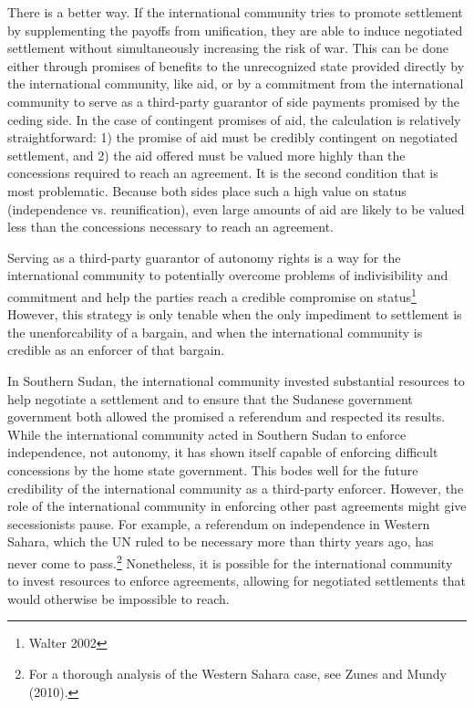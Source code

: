 \documentclass[12pt,letterpaper, notitlepage]{article}
\begin{document}
There is a better way. If the international community tries to promote settlement by supplementing the payoffs from unification, they are able to induce negotiated settlement without simultaneously increasing the risk of war.  This can be done either through promises of benefits to the unrecognized state provided directly by the international community, like aid, or by a commitment from the international community to serve as a third-party guarantor of side payments promised by the ceding side. In the case of contingent promises of aid, the calculation is relatively straightforward: 1) the promise of aid must be credibly contingent on negotiated settlement, and 2) the aid offered must be valued more highly than the concessions required to reach an agreement. It is the second condition that is most problematic. Because both sides place such a high value on status (independence vs. reunification), even large amounts of aid are likely to be valued less than the concessions necessary to reach an agreement.

Serving as a third-party guarantor of autonomy rights is a way for the international community to potentially overcome problems of indivisibility and commitment and help the parties reach a credible compromise on status\footnote{Walter 2002} However, this strategy is only tenable when the only impediment to settlement is the unenforcability of a bargain, and when the international community is credible as an enforcer of that bargain.


In Southern Sudan, the international community invested substantial resources to help negotiate a settlement and to ensure that the Sudanese government government both allowed the promised a referendum and respected its results. While the international community acted in Southern Sudan to enforce independence, not autonomy, it has shown itself capable of enforcing difficult concessions by the home state government. This bodes well for the future credibility of the international community as a third-party enforcer.  However, the role of the international community in enforcing other past agreements might give secessionists pause. For example, a referendum on independence in Western Sahara, which the UN ruled to be necessary more than thirty years ago, has never come to pass.\footnote{For a thorough analysis of the Western Sahara case, see Zunes and Mundy (2010).}  Nonetheless, it is possible for the international community to invest resources to enforce agreements, allowing for negotiated settlements that would otherwise be impossible to reach.
\end{document}
